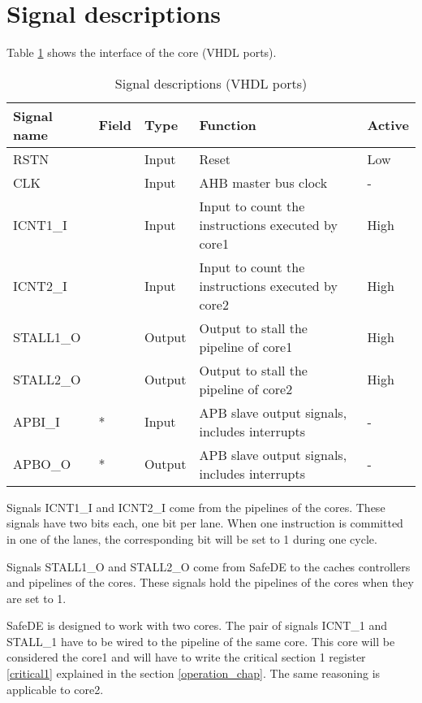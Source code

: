 \section{Signal descriptions}

Table \ref{t_ports} shows the interface of the core (VHDL ports).
\begin{table}[H]
	\caption{Signal descriptions (VHDL ports)}
	\label{t_ports}
	\centering
	\begin{footnotesize}
	\begin{tabular}{|l|l|l|p{6cm}|l|}
		\hline
		\textbf{Signal name} & \textbf{Field}  & \textbf{Type}  & \textbf{Function} & \textbf{Active}\\
		\hline
		RSTN & &Input &Reset & Low\\
		\hline
		CLK & &Input &AHB master bus clock & -\\
		\hline
		ICNT1\_I & &Input & Input to count the instructions executed by core1 & High\\
		\hline
		ICNT2\_I & &Input & Input to count the instructions executed by core2 & High\\
		\hline
		STALL1\_O & &Output & Output to stall the pipeline of core1 & High\\
		\hline
		STALL2\_O & &Output & Output to stall the pipeline of core2 & High\\
		\hline
		APBI\_I & * &Input &APB slave output signals, includes interrupts & - \\
		\hline
		APBO\_O & * &Output &APB slave output signals, includes interrupts & - \\
		\hline
	\end{tabular}
\end{footnotesize}
\end{table}

Signals ICNT1\_I and ICNT2\_I come from the pipelines of the cores. These signals have two bits each, one bit per lane. When one instruction is committed in one of the lanes, the corresponding bit will be set to 1 during one cycle.

Signals STALL1\_O and STALL2\_O come from SafeDE to the caches controllers and pipelines of the cores. These signals hold the pipelines of the cores when they are set to 1.

SafeDE is designed to work with two cores. The pair of signals ICNT\_1 and STALL\_1 have to be wired to the pipeline of the same core. This core will be considered the core1 and will have to write the critical section 1 register \ref{critical1} explained in the section \ref{operation_chap}. The same reasoning is applicable to core2.


\hspace{2cm}


